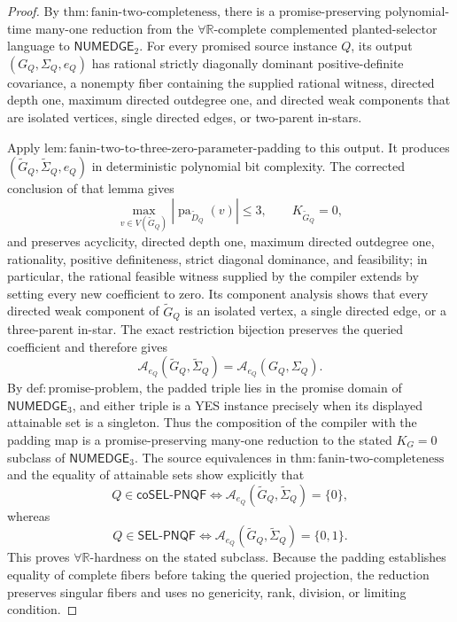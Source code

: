 \documentclass{article}
\begin{document}
\begin{proof}
By \(\mathrm{thm:fanin\mbox{-}two\mbox{-}completeness}\), there is a promise-preserving polynomial-time many-one reduction from the \(\forall\mathbb R\)-complete complemented planted-selector language to \(\mathsf{NUMEDGE}_2\). For every promised source instance \(Q\), its output \((G_Q,\Sigma_Q,e_Q)\) has rational strictly diagonally dominant positive-definite covariance, a nonempty fiber containing the supplied rational witness, directed depth one, maximum directed outdegree one, and directed weak components that are isolated vertices, single directed edges, or two-parent in-stars.

Apply \(\mathrm{lem:fanin\mbox{-}two\mbox{-}to\mbox{-}three\mbox{-}zero\mbox{-}parameter\mbox{-}padding}\) to this output. It produces \((\widetilde G_Q,\widetilde\Sigma_Q,e_Q)\) in deterministic polynomial bit complexity. The corrected conclusion of that lemma gives
\[
\max_{v\in V(\widetilde G_Q)}
|\operatorname{pa}_{\widetilde D_Q}(v)|\le3,
\qquad K_{\widetilde G_Q}=0,
\]
and preserves acyclicity, directed depth one, maximum directed outdegree one, rationality, positive definiteness, strict diagonal dominance, and feasibility; in particular, the rational feasible witness supplied by the compiler extends by setting every new coefficient to zero. Its component analysis shows that every directed weak component of \(\widetilde G_Q\) is an isolated vertex, a single directed edge, or a three-parent in-star. The exact restriction bijection preserves the queried coefficient and therefore gives
\[
\mathcal A_{e_Q}(\widetilde G_Q,\widetilde\Sigma_Q)
=\mathcal A_{e_Q}(G_Q,\Sigma_Q).
\]
By \(\mathrm{def:promise\mbox{-}problem}\), the padded triple lies in the promise domain of \(\mathsf{NUMEDGE}_3\), and either triple is a YES instance precisely when its displayed attainable set is a singleton. Thus the composition of the compiler with the padding map is a promise-preserving many-one reduction to the stated \(K_G=0\) subclass of \(\mathsf{NUMEDGE}_3\). The source equivalences in \(\mathrm{thm:fanin\mbox{-}two\mbox{-}completeness}\) and the equality of attainable sets show explicitly that
\[
Q\in\mathsf{coSEL\mbox{-}PNQF}
\Longleftrightarrow
\mathcal A_{e_Q}(\widetilde G_Q,\widetilde\Sigma_Q)=\{0\},
\]
whereas
\[
Q\in\mathsf{SEL\mbox{-}PNQF}
\Longleftrightarrow
\mathcal A_{e_Q}(\widetilde G_Q,\widetilde\Sigma_Q)=\{0,1\}.
\]
This proves \(\forall\mathbb R\)-hardness on the stated subclass. Because the padding establishes equality of complete fibers before taking the queried projection, the reduction preserves singular fibers and uses no genericity, rank, division, or limiting condition.


\end{proof}
\end{document}
